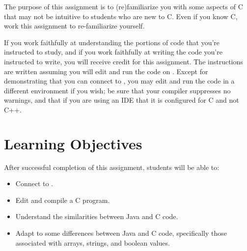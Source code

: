 



\renewcommand{\labnumber}{\pokerlabnumber}
\renewcommand{\labname}{C Programming Familiarization Lab}
\renewcommand{\shortlabname}{pokerlab}
\renewcommand{\collaborationrules}{\pokerlabcollaboration}
\renewcommand{\duedate}{\pokerlabdue}
\pagelayout

\labidentifier

The purpose of this assignment is to (re)familiarize you with some aspects of C
that may not be intuitive to students who are new to C. Even if you know C,
work this assignment to re-familiarize yourself.

If you work faithfully at understanding the portions of code that you're
instructed to study, and if you work faithfully at writing the code you're
instructed to write, you will receive credit for this assignment. The
instructions are written assuming you will edit and run the code on
\runtimeenvironment. Except for demonstrating that you can connect to
\runtimeenvironment, you may edit and run the code in a different environment
if you wish; be sure that your compiler suppresses no warnings, and that if you
are using an IDE that it is configured for C and not C++.

\section*{Learning Objectives}

After successful completion of this assignment, students will be able to:
\begin{itemize}
\item Connect to \runtimeenvironment.
\item Edit and compile a C program.
\item Understand the similarities between Java and C code.
\item Adapt to some differences between Java and C code, specifically those
    associated with arrays, strings, and boolean values.
\end{itemize}

